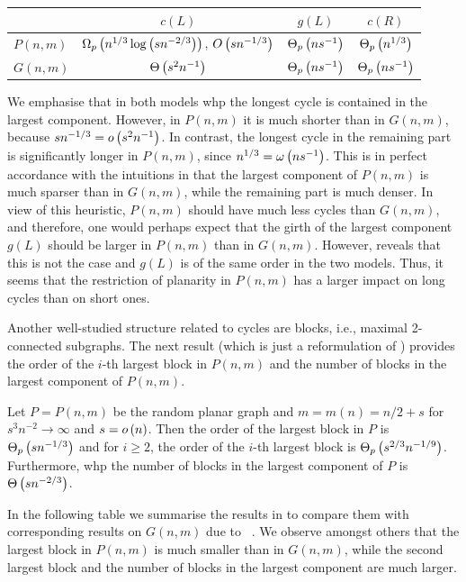 \begin{center}
\def\arraystretch{1.8}\tabcolsep=10pt
\begin{tabular}{l|c|c|c}
    & $c(L)$ & $g(L)$ & $c(R)$ \\[0.1cm]
    \hline
    $P(n,m)$ & $\Omega_p\left(n^{1/3}\log\left(sn^{-2/3}\right)\right)$, $O\left(sn^{-1/3}\right)$& $\Theta_p\left(ns^{-1}\right)$ & $\Theta_p\left(n^{1/3}\right)$ \\[0.1cm]
    \hline
    $G(n,m)$ & $\Theta\left(s^2n^{-1}\right)$ & $\Theta_p\left(ns^{-1}\right)$ & $\Theta_p\left(ns^{-1}\right)$
\end{tabular}
\end{center}
We emphasise that in both models whp the longest cycle is contained in the largest component. However, in $P(n,m)$ it is much shorter than in $G(n,m)$, because $sn^{-1/3}=o\left(s^2n^{-1}\right)$. In contrast, the longest cycle in the remaining part is significantly longer in $P(n,m)$, since $n^{1/3}=\omega\left(ns^{-1}\right)$. This is in perfect accordance with the intuitions in  that the largest component of $P(n,m)$ is much sparser than in $G(n,m)$, while the remaining part is much denser. In view of this heuristic, $P(n,m)$ should have much less cycles than $G(n,m)$, and therefore, one would perhaps expect that the girth of the largest component $g(L)$ should be larger in $P(n,m)$ than in $G(n,m)$. However,  reveals that this is not the case and $g(L)$ is of the same order in the two models. Thus, it seems that the restriction of planarity in $P(n,m)$ has a larger impact on long cycles than on short ones.

Another well-studied structure related to cycles are blocks, i.e., maximal 2-connected subgraphs. The next result (which is just a reformulation of ) provides the order of the $i$-th largest block in $P(n,m)$ and the number of blocks in the largest component of $P(n,m)$.
\begin{thm}\label{thm:main_block}
Let $P=P(n,m)$ be the random planar graph and $m=m(n)=n/2+s$ for $s^3n^{-2}\to\infty$ and $s=o\left(n\right)$. Then the order of the largest block in $P$ is $\Theta_p\left(sn^{-1/3}\right)$ and for $i\geq 2$, the order of the $i$-th largest block is $\Theta_p\left(s^{2/3}n^{-1/9}\right)$. Furthermore, whp the number of blocks in the largest component of $P$ is $\Theta\left(sn^{-2/3}\right)$.
\end{thm}
In the following table we summarise the results in  to compare them with corresponding results on $G(n,m)$ due to \Luczak\ \cite{Luczak1991b}. We observe amongst others that the largest block in $P(n,m)$ is much smaller than in $G(n,m)$, while the second largest block and the number of blocks in the largest component are much larger.

